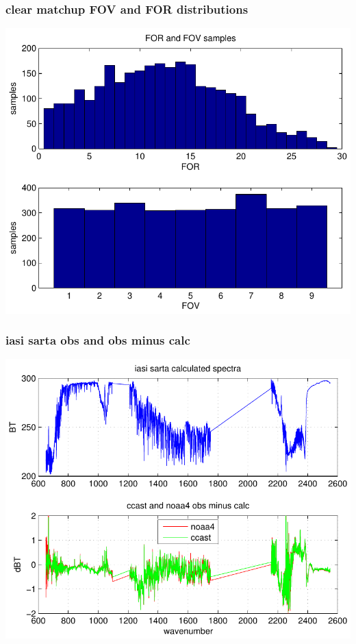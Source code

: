 \documentclass[11pt]{beamer}
\begin{document}
\begin{frame}
\frametitle{clear matchup FOV and FOR distributions}
\begin{center}
  \includegraphics[scale=0.7]{figures/FOV_FOR_bins.pdf}
\end{center}
\end{frame}
\begin{frame}
\frametitle{iasi sarta obs and obs minus calc}
\begin{center}
  \includegraphics[scale=0.7]{figures/iasi_sarta_1.pdf}
\end{center}
\end{frame}
\end{document}
